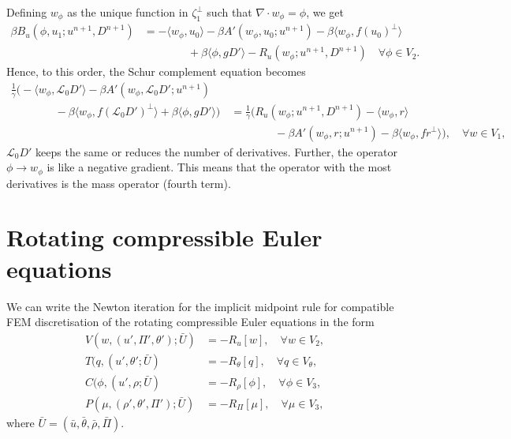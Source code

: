 \documentclass{article}
\begin{document}
Defining $w_\phi$ as the unique function in $\zeta_1^{\perp}$ such
that $\nabla\cdot w_\phi=\phi$, we get
\begin{align}
  \nonumber
  \beta B_u(\phi, u_1; u^{n+1},D^{n+1})
  & = 
  -\langle w_{\phi}, u_0 \rangle - \beta A'(w_\phi, u_0; u^{n+1})
  - \beta\langle w_\phi, f(u_0)^{\perp}\rangle \\
  & \qquad\qquad
  + \beta\langle \phi, gD'\rangle
  -R_u(w_\phi;u^{n+1},D^{n+1})
  \quad \forall \phi \in V_2.
\end{align}
Hence, to this order, the Schur complement equation becomes
\begin{align}
  \nonumber
  \frac{1}{\gamma}\Big(-\langle w_{\phi}, \mathcal{L}_0D' \rangle 
  - \beta A'(w_\phi, \mathcal{L}_0D'; u^{n+1}) \quad & \\
  \nonumber
\qquad  \qquad   - \beta\langle w_\phi, f(\mathcal{L}_0D')^{\perp}\rangle
  + \beta\langle \phi, gD'\rangle\Big)
  &= \frac{1}{\gamma}\Big(R_u(w_\phi;u^{n+1},D^{n+1})
  -\langle w_{\phi}, r \rangle  \\
  & \qquad\qquad -\beta A'(w_\phi, r; u^{n+1})
  - \beta\langle w_\phi, fr^{\perp}\rangle\Big),
  \quad \forall w \in V_1,
\end{align}
$\mathcal{L}_0D'$ keeps the same or reduces the number of derivatives.
Further, the operator $\phi\to w_\phi$ is like a negative gradient.
This means that the operator with the most derivatives is the
mass operator (fourth term).

\section{Rotating compressible Euler equations}

We can write the Newton iteration for the implicit midpoint rule for
compatible FEM discretisation of the rotating compressible Euler equations
in the form
\begin{align}
  V(w,(u',\Pi',\theta'); \bar{U}) & = -R_u[w], \quad \forall w\in V_2, \\
  T(q,(u',\theta'; \bar{U}) & = -R_\theta[q], \quad \forall q\in V_\theta, \\
  C(\phi,(u',\rho; \bar{U}) & = -R_\rho[\phi], \quad \forall \phi \in V_3, \\
  P(\mu,(\rho',\theta',\Pi'); \bar{U}) & = -R_\Pi[\mu], \quad
  \forall \mu \in V_3,
\end{align}
where $\bar{U}=(\bar{u},\bar{\theta},\bar{\rho},\bar{\Pi})$.
\end{document}
